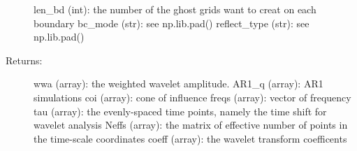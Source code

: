 \documentclass[letterpaper,10pt,english]{sphinxmanual}
\begin{document}
\begin{fulllineitems}
\begin{description}
\begin{description}
\end{description}

len\_bd (int): the number of the ghost grids want to creat on each boundary
bc\_mode (str): see np.lib.pad()
reflect\_type (str): see np.lib.pad()

\item[{Returns:}] \leavevmode
wwa (array): the weighted wavelet amplitude.
AR1\_q (array): AR1 simulations
coi (array): cone of influence
freqs (array): vector of frequency
tau (array): the evenly-spaced time points, namely the time shift for wavelet analysis
Neffs (array): the matrix of effective number of points in the time-scale coordinates
coeff (array): the wavelet transform coefficents

\end{description}

\end{fulllineitems}

\end{document}
